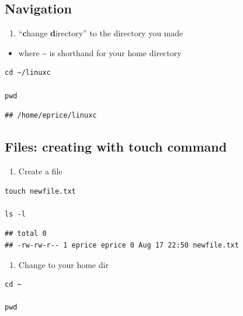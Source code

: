 \documentclass[
]{book}
\providecommand{\tightlist}{%
  \setlength{\itemsep}{0pt}\setlength{\parskip}{0pt}}
\begin{document}
\hypertarget{navigation}{%
\subsection{Navigation}\label{navigation}}

\begin{enumerate}
\def\labelenumi{\arabic{enumi})}
\tightlist
\item
  ``\textbf{c}hange \textbf{d}irectory'' to the directory you made
\end{enumerate}

\begin{itemize}
\tightlist
\item
  where \textasciitilde{} is shorthand for your home directory
\end{itemize}

\begin{verbatim}
cd ~/linuxc

pwd
\end{verbatim}

\begin{verbatim}
## /home/eprice/linuxc
\end{verbatim}

\hypertarget{files-creating-with-touch-command}{%
\subsection{Files: creating with touch command}\label{files-creating-with-touch-command}}

\begin{enumerate}
\def\labelenumi{\arabic{enumi})}
\tightlist
\item
  Create a file
\end{enumerate}

\begin{verbatim}
touch newfile.txt

ls -l
\end{verbatim}

\begin{verbatim}
## total 0
## -rw-rw-r-- 1 eprice eprice 0 Aug 17 22:50 newfile.txt
\end{verbatim}

\begin{enumerate}
\def\labelenumi{\arabic{enumi})}
\setcounter{enumi}{1}
\tightlist
\item
  Change to your home dir
\end{enumerate}

\begin{verbatim}
cd ~ 

pwd
\end{verbatim}
\end{document}
